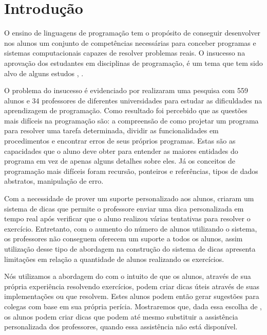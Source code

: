 \chapter{Introdução}

O ensino de linguagens de programação tem o propósito de conseguir desenvolver nos alunos um conjunto de competências necessárias para conceber programas e sistemas computacionais capazes de resolver problemas reais. O insucesso na aprovação dos estudantes em disciplinas de programação, é um tema que tem sido alvo de alguns estudos \cite{bosse2015reprovaccoes}, \cite{Cukierman:2015:PSU:2729094.2742623}.

O problema do insucesso é evidenciado por  realizaram uma pesquisa com 559 alunos e 34 professores de diferentes universidades para estudar as dificuldades na aprendizagem de programação. Como resultado foi percebido que as questões mais difíceis na programação são: a compreensão de como projetar um programa para resolver uma tarefa determinada, dividir as funcionalidades em procedimentos e encontrar erros de seus próprios programas. Estas são as capacidades que o aluno deve obter para entender as maiores entidades do programa em vez de apenas alguns detalhes sobre eles. Já os conceitos de programação mais difíceis foram recursão, ponteiros e referências, tipos de dados abstratos, manipulação de erro.

Com a necessidade de prover um suporte personalizado aos alunos,  criaram um sistema de dicas que permite o professore enviar uma dica personalizada em tempo real após verificar que o aluno realizou várias tentativas para resolver o exercício. Entretanto, com o aumento do número de alunos utilizando o sistema, os professores não conseguem oferecem um suporte a todos os alunos, assim utilização desse tipo de abordagem na construção do sistema de dicas apresenta limitações em relação a quantidade de alunos realizando os exercícios.

Nós utilizamos a abordagem do  com o intuito de que os alunos, através de sua própria experiência resolvendo exercícios, podem criar dicas úteis através de suas implementações ou  que resolvem. Estes alunos podem então gerar sugestões para colegas com base em sua própria perícia. Mostraremos que, dada essa escolha de , os alunos podem criar dicas que podem até mesmo substituir a assistência personalizada dos professores, quando essa assistência não está disponível.


